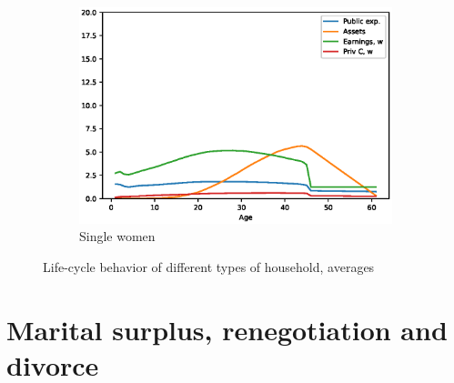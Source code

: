 \documentclass[]{article}
\begin{document}
\begin{figure}[H]
\begin{subfigure}{0.49\textwidth}
		\includegraphics[width=\textwidth]{lifecycle_singlew.eps} %
		\caption{Single women}
		\label{fig:picture3}
	\end{subfigure}
	
	\caption{Life-cycle behavior of different types of household, averages}
	\label{fig:all_pictures}
\end{figure}

\section{Marital surplus, renegotiation and divorce}




\end{document}
